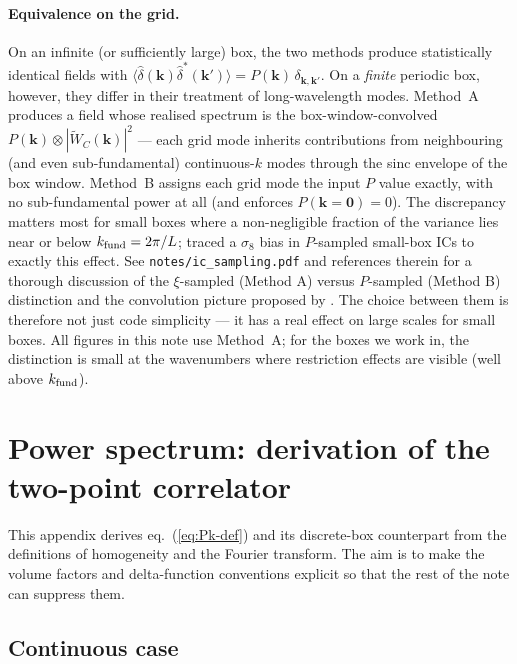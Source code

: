 \documentclass[12pt]{article}
\newcommand{\noteicsampling}{\texttt{notes/ic\_sampling.pdf}\xspace}
\begin{document}
\paragraph{Equivalence on the grid.}
On an infinite (or sufficiently large) box, the two methods produce
statistically identical fields with
$\langle\hat\delta(\mathbf k)\hat\delta^*(\mathbf k')\rangle = P(\mathbf k)\,\delta_{\mathbf k,\mathbf k'}$.
On a \emph{finite} periodic box, however, they differ in their
treatment of long-wavelength modes. Method~A produces a field whose
realised spectrum is the box-window-convolved $P(\mathbf k)\otimes|\tilde W_C(\mathbf k)|^2$ ---
each grid mode inherits contributions from neighbouring (and even
sub-fundamental) continuous-$k$ modes through the sinc envelope of the
box window. Method~B assigns each grid mode the input $P$ value
exactly, with no sub-fundamental power at all (and enforces
$P(\mathbf k=\mathbf 0)=0$). The discrepancy matters most for small
boxes where a non-negligible fraction of the variance lies near or
below $k_{\rm fund}=2\pi/L$; \citet{Sirko2005} traced a $\sigma_8$
bias in $P$-sampled small-box ICs to exactly this effect. See
\noteicsampling and references therein
\citep{Pen1997, Sirko2005, Hahn2011} for a thorough discussion of the
$\xi$-sampled (Method A) versus $P$-sampled (Method B) distinction
and the convolution picture proposed by \citet{Pen1997}. The choice between them is therefore not just code
simplicity --- it has a real effect on large scales for small boxes.
All figures in this note use Method~A; for the boxes we work in, the
distinction is small at the wavenumbers where restriction effects are
visible (well above $k_{\rm fund}$).

\section{Power spectrum: derivation of the two-point correlator}\label{app:pkdef}

This appendix derives eq.~(\ref{eq:Pk-def}) and its discrete-box
counterpart from the definitions of homogeneity and the Fourier
transform. The aim is to make the volume factors and delta-function
conventions explicit so that the rest of the note can suppress them.

\subsection*{Continuous case}
\end{document}

